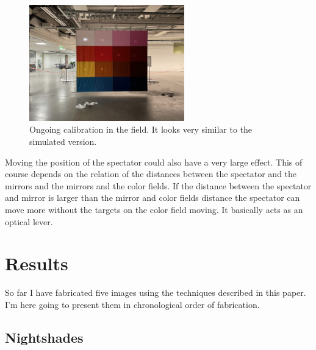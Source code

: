 \documentclass{article}
\begin{document}
\begin{figure}[ht!]
\centering
\includegraphics[width=0.6\textwidth]{images/calibration-photo.png}
\caption{Ongoing calibration in the field. It looks very similar to the simulated version.}
\end{figure}


Moving the position of the spectator could also have a very large
effect. This of course depends on the relation of the distances between
the spectator and the mirrors and the mirrors and the color fields. If
the distance between the spectator and mirror is larger than the mirror
and color fields distance the spectator can move more without the
targets on the color field moving. It basically acts as an optical
lever.



\clearpage

\section{Results}

So far I have fabricated five images using the techniques described in
this paper. I'm here going to present them in chronological order of
fabrication.

\subsection{Nightshades}
\end{document}
